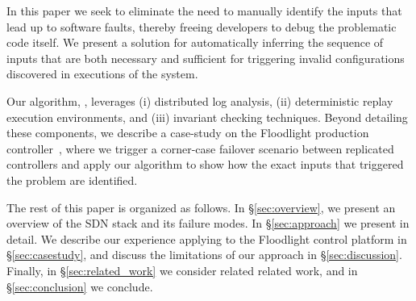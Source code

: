 In this paper we seek to eliminate the need to manually identify the inputs that lead
up to software faults, thereby freeing developers to debug the problematic code itself.
We present a solution for automatically inferring the sequence
of inputs that are both necessary and sufficient for
triggering invalid configurations discovered in executions of the system.

Our algorithm, \simulator{}, leverages (i)
distributed log analysis, (ii) deterministic replay
execution environments, and (iii) invariant checking techniques.
Beyond detailing these components, we describe a case-study
on the Floodlight production
controller~\cite{floodlight}, where we trigger a
corner-case failover scenario between replicated controllers and apply our
algorithm to show how the exact inputs that triggered the problem are
identified.


The rest of this paper is organized as follows. In \S\ref{sec:overview},
we present an overview of the SDN stack and its failure modes.
In \S\ref{sec:approach} we present \simulator{} in detail.
We describe our experience applying \simulator{} to the Floodlight
control platform in \S\ref{sec:casestudy}, and discuss the limitations of our
approach in \S\ref{sec:discussion}. Finally, in \S\ref{sec:related_work}
we consider related related work,
and in \S\ref{sec:conclusion} we conclude.


